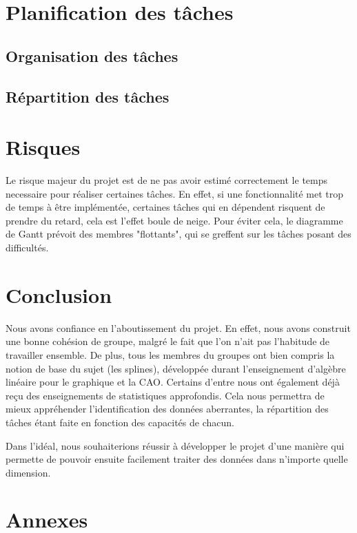\documentclass[a4paper,10pt]{article} %
\begin{document}
\section{Planification des tâches}

	\subsection{Organisation des tâches}

	\subsection{Répartition des tâches}

\section{Risques}

Le risque majeur du projet est de ne pas avoir estimé correctement le temps necessaire pour réaliser certaines tâches. En effet, si une fonctionnalité met trop de temps à être implémentée, certaines tâches qui en dépendent risquent de prendre du retard, cela est l'effet boule de neige. Pour éviter cela, le diagramme de Gantt prévoit des membres "flottants", qui se greffent sur les tâches posant des difficultés.

\section*{Conclusion}

Nous avons confiance en l'aboutissement du projet. En effet, nous avons construit une bonne cohésion de groupe, malgré le fait que l'on n'ait pas l'habitude de travailler ensemble. De plus, tous les membres du groupes ont bien compris la notion de base du sujet (les splines), développée durant l'enseignement d'algèbre linéaire pour le graphique et la CAO. Certains d'entre nous ont également déjà reçu des enseignements de statistiques approfondis. Cela nous permettra de mieux appréhender l'identification des données aberrantes, la répartition des tâches étant faite en fonction des capacités de chacun. 

Dans l'idéal, nous souhaiterions réussir à développer le projet d'une manière qui permette de pouvoir ensuite facilement traiter des données dans n'importe quelle dimension.

\section*{Annexes}
\end{document}
